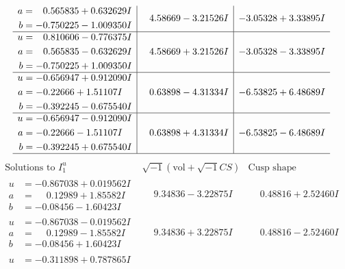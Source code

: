 \documentclass[1p]{elsarticle_modified}
\theoremstyle{definition}
\newcommand{\I}{\sqrt{-1}}
\begin{document}
$$\begin{array}{c|c|c}
\begin{aligned}
a &= \phantom{-}0.565835 + 0.632629 I \\
b &= -0.750225 - 1.009350 I\end{aligned}
 & \phantom{-}4.58669 - 3.21526 I & -3.05328 + 3.33895 I \\ \hline\begin{aligned}
u &= \phantom{-}0.810606 - 0.776375 I \\
a &= \phantom{-}0.565835 - 0.632629 I \\
b &= -0.750225 + 1.009350 I\end{aligned}
 & \phantom{-}4.58669 + 3.21526 I & -3.05328 - 3.33895 I \\ \hline\begin{aligned}
u &= -0.656947 + 0.912090 I \\
a &= -0.22666 + 1.51107 I \\
b &= -0.392245 - 0.675540 I\end{aligned}
 & \phantom{-}0.63898 - 4.31334 I & -6.53825 + 6.48689 I \\ \hline\begin{aligned}
u &= -0.656947 - 0.912090 I \\
a &= -0.22666 - 1.51107 I \\
b &= -0.392245 + 0.675540 I\end{aligned}
 & \phantom{-}0.63898 + 4.31334 I & -6.53825 - 6.48689 I\\
 \hline 
 \end{array}$$\newpage$$\begin{array}{c|c|c}  
\text{Solutions to }I^u_{1}& \I (\text{vol} + \sqrt{-1}CS) & \text{Cusp shape}\\
 \hline 
\begin{aligned}
u &= -0.867038 + 0.019562 I \\
a &= \phantom{-}0.12989 + 1.85582 I \\
b &= -0.08456 - 1.60423 I\end{aligned}
 & \phantom{-}9.34836 - 3.22875 I & \phantom{-}0.48816 + 2.52460 I \\ \hline\begin{aligned}
u &= -0.867038 - 0.019562 I \\
a &= \phantom{-}0.12989 - 1.85582 I \\
b &= -0.08456 + 1.60423 I\end{aligned}
 & \phantom{-}9.34836 + 3.22875 I & \phantom{-}0.48816 - 2.52460 I \\ \hline\begin{aligned}
u &= -0.311898 + 0.787865 I \\

\end{aligned}
\end{array}$$
\end{document}
